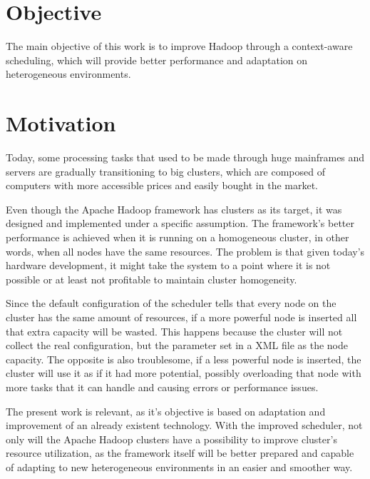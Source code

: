 \section{Objective}

The main objective of this work is to improve Hadoop through a context-aware scheduling, which will provide better performance and adaptation on heterogeneous environments.

\section{Motivation}

Today, some processing tasks that used to be made through huge mainframes and servers are gradually transitioning to big clusters, which are composed of computers with more accessible prices and easily bought in the market. 

Even though the Apache Hadoop framework has clusters as its target, it was designed and implemented under a specific assumption. The framework's better performance is achieved when it is running on a homogeneous cluster, in other words, when all nodes have the same resources. The problem is that given today's hardware development, it might take the system to a point where it is not possible or at least not profitable to maintain cluster homogeneity. 

Since the default configuration of the scheduler tells that every node on the cluster has the same amount of resources, if a more powerful node is inserted all that extra capacity will be wasted. This happens because the cluster will not collect the real configuration, but the parameter set in a XML file as the node capacity. The opposite is also troublesome, if a less powerful node is inserted, the cluster will use it as if it had more potential, possibly overloading that node with more tasks that it can handle and causing errors or performance issues.

The present work is relevant, as it's objective is based on adaptation and improvement of an already existent technology. With the improved scheduler, not only will the Apache Hadoop clusters have a possibility to improve cluster's resource utilization, as the framework itself will be better prepared and capable of adapting to new heterogeneous environments in an easier and smoother way.